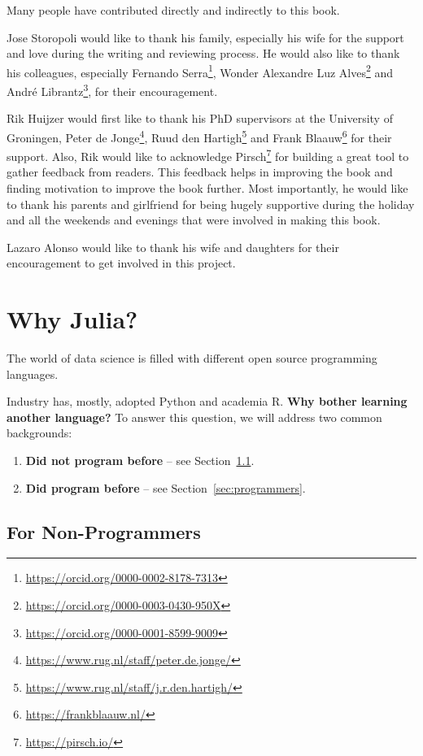 \documentclass[
  notoc %
]{tufte-book}
\DeclareRobustCommand{\href}[2]{#2\footnote{\url{#1}}}
\begin{document}
Many people have contributed directly and indirectly to this book.

Jose Storopoli would like to thank his family, especially his wife for
the support and love during the writing and reviewing process. He would
also like to thank his colleagues, especially
\href{https://orcid.org/0000-0002-8178-7313}{Fernando Serra},
\href{https://orcid.org/0000-0003-0430-950X}{Wonder Alexandre Luz Alves}
and \href{https://orcid.org/0000-0001-8599-9009}{André Librantz}, for
their encouragement.

Rik Huijzer would first like to thank his PhD supervisors at the
University of Groningen,
\href{https://www.rug.nl/staff/peter.de.jonge/}{Peter de Jonge},
\href{https://www.rug.nl/staff/j.r.den.hartigh/}{Ruud den Hartigh} and
\href{https://frankblaauw.nl/}{Frank Blaauw} for their support. Also,
Rik would like to acknowledge \href{https://pirsch.io/}{Pirsch} for
building a great tool to gather feedback from readers. This feedback
helps in improving the book and finding motivation to improve the book
further. Most importantly, he would like to thank his parents and
girlfriend for being hugely supportive during the holiday and all the
weekends and evenings that were involved in making this book.

Lazaro Alonso would like to thank his wife and daughters for their
encouragement to get involved in this project.

\hypertarget{sec:why_julia}{%
\chapter{Why Julia?}\label{sec:why_julia}}

The world of data science is filled with different open source
programming languages.

Industry has, mostly, adopted Python and academia R. \textbf{Why bother
learning another language?} To answer this question, we will address two
common backgrounds:

\begin{enumerate}
\def\labelenumi{\arabic{enumi}.}
\item
  \textbf{Did not program before} -- see
  Section~\ref{sec:non-programmers}.
\item
  \textbf{Did program before} -- see Section~\ref{sec:programmers}.
\end{enumerate}

\hypertarget{sec:non-programmers}{%
\section{For Non-Programmers}\label{sec:non-programmers}}
\end{document}
